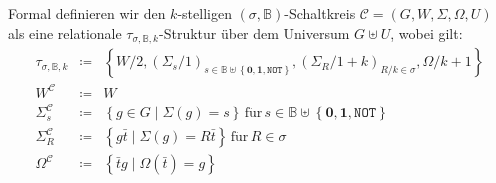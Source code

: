 \begin{defn}
\label{def:formal}Formal definieren wir den $k$-stelligen $\left(\sigma,\mathbb{B}\right)$-Schaltkreis
$\mathcal{C}=\left(G,W,\Sigma,\Omega,U\right)$ als eine relationale
$\tau_{\sigma,\mathbb{B},k}$-Struktur über dem Universum $G\uplus U$,
wobei gilt:
\begin{eqnarray*}
\tau_{\sigma,\mathbb{B},k} & \coloneqq & \left\{ W/2,\left(\Sigma_{s}/1\right)_{s\in\mathbb{B}\uplus\left\{ \mathbf{0},\mathbf{1},\mathtt{NOT}\right\} },\left(\Sigma_{R}/1+k\right)_{R/k\in\sigma},\Omega/k+1\right\} \\
W^{\mathcal{C}} & \coloneqq & W\\
\Sigma_{s}^{\mathcal{C}} & \coloneqq & \left\{ g\in G\mid\Sigma\left(g\right)=s\right\} \,\mathrm{f\ddot{u}r}\,s\in\mathbb{B}\uplus\left\{ \mathbf{0},\mathbf{1},\mathtt{NOT}\right\} \\
\Sigma_{R}^{\mathcal{C}} & \coloneqq & \left\{ g\bar{t}\mid\Sigma\left(g\right)=R\bar{t}\right\} \,\mathrm{f\ddot{u}r}\,R\in\sigma\\
\Omega^{\mathcal{C}} & \coloneqq & \left\{ \bar{t}g\mid\Omega\left(\bar{t}\right)=g\right\} 
\end{eqnarray*}
\end{defn}
%
